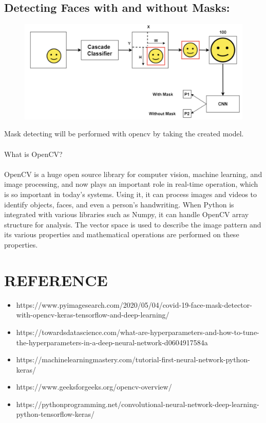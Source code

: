 \documentclass[a4paper, 12pt]{article}
\begin{document}
\subsection{Detecting Faces with and without Masks:}
\begin{figure}[h]
\includegraphics[scale=.41]{5.png}
\centering
\end{figure}
Mask detecting will be performed with opencv by taking the created model. \\ \\
What is OpenCV?\\ \\
OpenCV is a huge open source library for computer vision, machine learning, and image processing, and now plays an important role in real-time operation, which is so important in today's systems. Using it, it can process images and videos to identify objects, faces, and even a person's handwriting. When Python is integrated with various libraries such as Numpy, it can handle OpenCV array structure for analysis. The vector space is used to describe the image pattern and its various properties and mathematical operations are performed on these properties. \\

\section{REFERENCE}
\begin{itemize}
\item https://www.pyimagesearch.com/2020/05/04/covid-19-face-mask-detector-with-opencv-keras-tensorflow-and-deep-learning/
\item https://towardsdatascience.com/what-are-hyperparameters-and-how-to-tune-the-hyperparameters-in-a-deep-neural-network-d0604917584a
\item https://machinelearningmastery.com/tutorial-first-neural-network-python-keras/
\item https://www.geeksforgeeks.org/opencv-overview/
\item https://pythonprogramming.net/convolutional-neural-network-deep-learning-python-tensorflow-keras/
\end{itemize}
\end{document}
